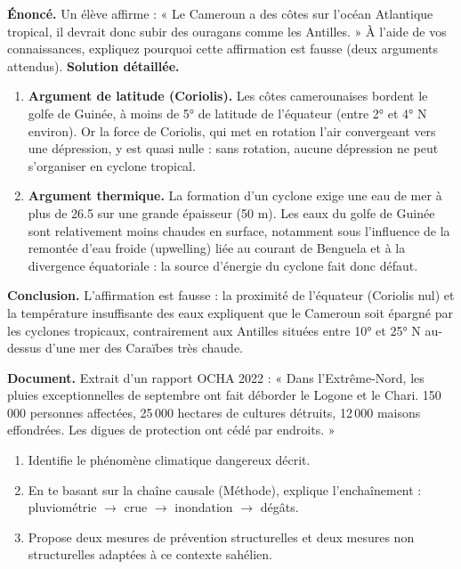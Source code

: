 \documentclass[11pt]{article}
\begin{document}
\begin{exoresolu}
\textbf{Énoncé.} Un élève affirme : « Le Cameroun a des côtes sur l'océan Atlantique tropical, il devrait donc subir des ouragans comme les Antilles. » À l'aide de vos connaissances, expliquez pourquoi cette affirmation est fausse (deux arguments attendus).
\tcblower
\textbf{Solution détaillée.}
\begin{enumerate}
\item \textbf{Argument de latitude (Coriolis).} Les côtes camerounaises bordent le golfe de Guinée, à moins de 5° de latitude de l'équateur (entre 2° et 4° N environ). Or la force de Coriolis, qui met en rotation l'air convergeant vers une dépression, y est quasi nulle : sans rotation, aucune dépression ne peut s'organiser en cyclone tropical.
\item \textbf{Argument thermique.} La formation d'un cyclone exige une eau de mer à plus de \num{26,5} \textcelsius{} sur une grande épaisseur (50 m). Les eaux du golfe de Guinée sont relativement moins chaudes en surface, notamment sous l'influence de la remontée d'eau froide (upwelling) liée au courant de Benguela et à la divergence équatoriale : la source d'énergie du cyclone fait donc défaut.
\end{enumerate}
\textbf{Conclusion.} L'affirmation est fausse : la proximité de l'équateur (Coriolis nul) et la température insuffisante des eaux expliquent que le Cameroun soit épargné par les cyclones tropicaux, contrairement aux Antilles situées entre 10° et 25° N au-dessus d'une mer des Caraïbes très chaude.
\end{exoresolu}

\begin{exercice}
\textbf{Document.} Extrait d'un rapport OCHA 2022 : « Dans l'Extrême-Nord, les pluies exceptionnelles de septembre ont fait déborder le Logone et le Chari. 150\,000 personnes affectées, 25\,000 hectares de cultures détruits, 12\,000 maisons effondrées. Les digues de protection ont cédé par endroits. »
\begin{enumerate}
\item Identifie le phénomène climatique dangereux décrit.
\item En te basant sur la chaîne causale (Méthode), explique l'enchaînement : pluviométrie $\rightarrow$ crue $\rightarrow$ inondation $\rightarrow$ dégâts.
\item Propose deux mesures de prévention structurelles et deux mesures non structurelles adaptées à ce contexte sahélien.
\end{enumerate}
\end{exercice}
\end{document}

